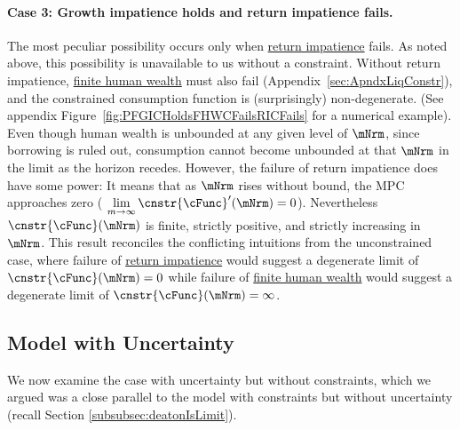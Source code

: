 \documentclass[BufferStockTheory]{subfiles}
\begin{document}
\hypertarget{RICandFHWCFail}{}
\paragraph{Case 3: Growth impatience holds and return impatience fails.} The most peculiar possibility occurs only when \hyperlink{RIC}{return impatience} fails.
As noted above, this possibility is unavailable to us without a constraint.
Without return impatience, \hyperlink{FHWC}{finite human wealth} must also fail (Appendix~\ref{sec:ApndxLiqConstr}), and the constrained consumption function is (surprisingly) non-degenerate.
(See appendix Figure~\ref{fig:PFGICHoldsFHWCFailsRICFails} for a numerical example).
Even though human wealth is unbounded at any given level of $\mNrm$, since borrowing is ruled out, consumption cannot become unbounded at that $\mNrm$ in the limit as the horizon recedes.
However, the failure of return impatience does have some power: It means that as $\mNrm$ rises without bound, the MPC approaches zero ( $\lim\limits_{m \rightarrow \infty} \cnstr{\cFunc}^{\prime}(\mNrm) = 0$).
Nevertheless $\cnstr{\cFunc}(\mNrm)$ is finite, strictly positive, and strictly increasing in $\mNrm$.
This result reconciles the conflicting intuitions from the unconstrained case, where failure of \hyperlink{RIC}{return impatience} would suggest a degenerate limit of $\cnstr{\cFunc}(\mNrm)=0$ while failure of \hyperlink{FHWC}{finite human wealth} would suggest a degenerate limit of $\cnstr{\cFunc}(\mNrm)=\infty$.









\hypertarget{model-with-uncertainty}{}
\subsection{Model with Uncertainty}\label{subsec:TheModelUncertainty}

We now examine the case with uncertainty but without constraints, which we argued was a close parallel to the model with constraints but without uncertainty (recall Section \ref{subsubsec:deatonIsLimit}).
\hypertarget{Calibration}{}


\hypertarget{Symbols}{}


\end{document}
